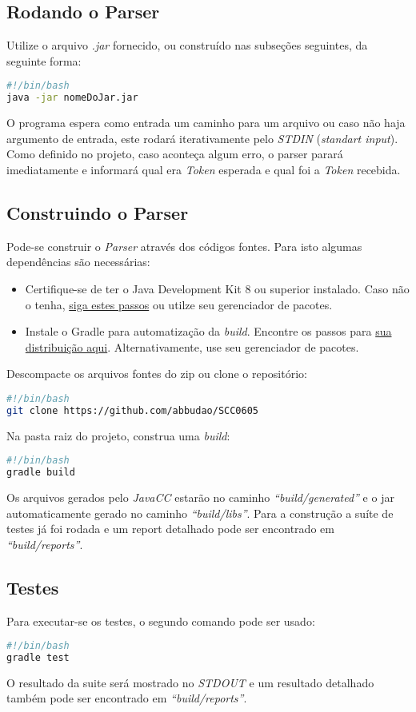 \documentclass[a4paper,12pt]{article}
\begin{document}
\subsection{Rodando o Parser}
Utilize o arquivo \emph{.jar} fornecido, ou construído nas subseções seguintes, da seguinte forma:
\begin{lstlisting}[language=bash,caption={Executando o Parser}]
#!/bin/bash
java -jar nomeDoJar.jar
\end{lstlisting}
O programa espera como entrada um caminho para um arquivo ou caso não haja argumento de entrada, este rodará iterativamente pelo \emph{STDIN} (\emph{standart input}). Como definido no projeto, caso aconteça algum erro, o parser parará imediatamente e informará qual era \emph{Token} esperada e qual foi a \emph{Token} recebida.

\subsection{Construindo o Parser}
Pode-se construir o \emph{Parser} através dos códigos fontes. Para isto algumas dependências são necessárias:
\begin{itemize}
\item Certifique-se de ter o Java Development Kit 8 ou superior instalado. Caso não o tenha, \href{https://docs.oracle.com/javase/8/docs/technotes/guides/install/install\_overview.html}{siga estes passos} ou utilze seu gerenciador de pacotes.
\item Instale o Gradle para automatização da \emph{build}. Encontre os passos para \href{https://gradle.org/install/}{sua distribuição aqui}. Alternativamente, use seu gerenciador de pacotes.
\end{itemize}
Descompacte os arquivos fontes do zip ou clone o repositório:
\begin{lstlisting}[language=bash,caption={Obtendo os arquivos fontes}]
#!/bin/bash
git clone https://github.com/abbudao/SCC0605 
\end{lstlisting}
Na pasta raiz do projeto, construa uma \emph{build}:
\begin{lstlisting}[language=bash,caption={Construção automatizada}]
#!/bin/bash
gradle build
\end{lstlisting}
Os arquivos gerados pelo \emph{JavaCC} estarão no caminho \emph{``build/generated''}
 e o jar automaticamente gerado no caminho \emph{``build/libs''}. Para a construção a suíte de testes já foi rodada e um report detalhado pode ser encontrado em \emph{``build/reports''}.
 
\subsection{Testes}
Para executar-se os testes, o segundo comando pode ser usado:
\begin{lstlisting}[language=bash,caption={Rodando a suíte de testes}]
#!/bin/bash
gradle test 
\end{lstlisting}
O resultado da suite será mostrado no \emph{STDOUT} e um resultado detalhado também pode ser encontrado
em \emph{``build/reports''}.
\end{document}
